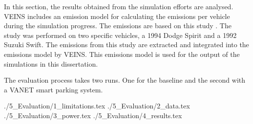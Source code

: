 In this section, the results obtained from the simulation efforts are analysed. \ac{VEINS} includes an emission model for calculating the emissions per vehicle during the simulation progress. The emissions are based on this study \citep{Cappiello2002AConsumption}. The study was performed on two specific vehicles, a 1994 Dodge Spirit and a 1992 Suzuki Swift. The emissions from this study are extracted and integrated into the emissions model by \ac{VEINS}. This emissions model is used for the output of the simulations in this dissertation.

The evaluation process takes two runs. One for the baseline and the second with a VANET smart parking system.

{./5_Evaluation/1_limitations.tex}
{./5_Evaluation/2_data.tex}
{./5_Evaluation/3_power.tex}
{./5_Evaluation/4_results.tex}

